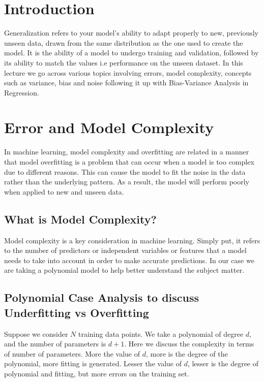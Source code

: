 \documentclass[12pt]{article}
\begin{document}
\MakeScribeTop


\section{Introduction}

Generalization refers to your model's ability to adapt properly to new, previously unseen data, drawn from the same distribution as the one used to create the model. It is the ability of a model to undergo training and validation, followed by its  ability to match the values i.e performance on the unseen dataset. In this lecture we go across various topics involving errors, model complexity,  concepts such as variance, bias and noise following it up with Bias-Variance Analysis in Regression.

\section{Error and Model Complexity}

In machine learning, model complexity and overfitting are related in a manner that model overfitting is a problem that can occur when a model is too complex due to different reasons. This can cause the model to fit the noise in the data rather than the underlying pattern. As a result, the model will perform poorly when applied to new and unseen data. 

\subsection{What is Model Complexity?}

Model complexity is a key consideration in machine learning. Simply put, it refers to the number of predictors or independent variables or features that a model needs to take into account in order to make accurate predictions. In our case we are taking a polynomial model to help better understand the subject matter.

\subsection{Polynomial Case Analysis to discuss Underfitting vs Overfitting}

Suppose we consider $N$ training data points. We take a polynomial of degree $d$, and the number of parameters is $d+1$. Here we discuss the complexity in terms of number of parameters. More the value of $d$, more is the degree of the polynomial, more fitting is generated. Lesser the value of $d$, lesser is the degree of polynomial and fitting, but more errors on the training set.
\end{document}
